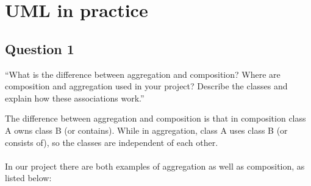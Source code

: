 \chapter{UML in practice}
\section{Question 1}
``What is the difference between aggregation and composition? Where are composition and aggregation
used in your project? Describe the classes and explain how these associations work.''

The difference between aggregation and composition is that in composition class A owns class B (or contains). While in aggregation, class A uses class B (or consists of), so the classes are independent of each other. 
\\\\
In our project there are both examples of aggregation as well as composition, as listed below:


